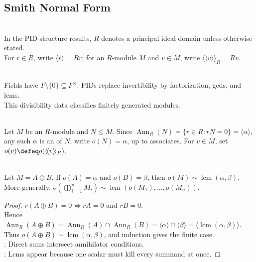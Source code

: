 \subsection{Smith Normal Form}

\begin{definition} \label{def:standing-pid-notation} \\
In the PID-structure results, $R$ denotes a principal ideal domain unless otherwise stated.\\
For $r\in R$, write $\langle r\rangle=Rr$; for an $R$-module $M$ and $v\in M$, write $\langle\!\langle v\rangle\!\rangle_R=Rv$.
\end{definition}

\begin{perspective} \label{per:pid-modules-scalar-arithmetic-controls-structure} \\
Fields have $F\setminus\{0\}\subseteq F^\times$. PIDs replace invertibility by factorization, gcds, and lcms.\\
This divisibility data classifies finitely generated modules.
\end{perspective}

\begin{definition} \label{def:module-order-over-pid} \\
Let $M$ be an $R$-module and $N\leq M$. Since $\operatorname{Ann}_R(N)=\{r\in R:rN=0\}=\langle\alpha\rangle$, any such $\alpha$ is an  of $N$; write $o(N)=\alpha$, up to associates. For $v\in M$, set $o(v)\defeq o(\langle\!\langle v\rangle\!\rangle_R)$.
\end{definition}

\begin{proposition} \label{prop:orders-direct-sum-lcm} \\
Let $M=A\oplus B$. If $o(A)=\alpha$ and $o(B)=\beta$, then $o(M)\sim\operatorname{lcm}(\alpha,\beta)$.\\
More generally, $o(\bigoplus\limits_{i=1}^{n}M_i)\sim\operatorname{lcm}(o(M_1),\ldots,o(M_n))$.
\begin{proof}
$r(A\oplus B)=0\Longleftrightarrow rA=0$ and $rB=0$.\\
Hence $\operatorname{Ann}_R(A\oplus B)=\operatorname{Ann}_R(A)\cap\operatorname{Ann}_R(B) =\langle\alpha\rangle\cap\langle\beta\rangle =\langle\operatorname{lcm}(\alpha,\beta)\rangle$.\\
Thus $o(A\oplus B)\sim\operatorname{lcm}(\alpha,\beta)$, and induction gives the finite case.\\
: Direct sums intersect annihilator conditions.\\
: Lcms appear because one scalar must kill every summand at once.
\end{proof}
\end{proposition}

